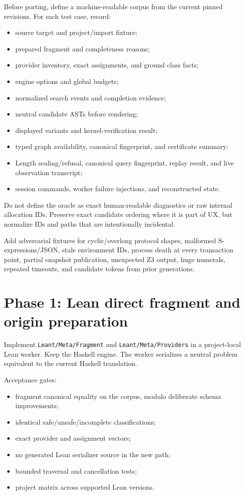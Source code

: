 \documentclass[10pt,letterpaper,oneside]{report}
\newcommand{\filepath}[1]{\nolinkurl{#1}}
\begin{document}
Before porting, define a machine-readable corpus from the current pinned revisions. For each test case, record:

\begin{itemize}
  \item source target and project/import fixture;
  \item prepared fragment and completeness reasons;
  \item provider inventory, exact assignments, and ground class facts;
  \item engine options and global budgets;
  \item normalized search events and completion evidence;
  \item neutral candidate ASTs before rendering;
  \item displayed variants and kernel-verification result;
  \item typed graph availability, canonical fingerprint, and certificate summary;
  \item Length sealing/refusal, canonical query fingerprint, replay result, and live observation transcript;
  \item session commands, worker failure injections, and reconstructed state.
\end{itemize}

Do not define the oracle as exact human-readable diagnostics or raw internal allocation IDs. Preserve exact candidate ordering where it is part of UX, but normalize IDs and paths that are intentionally incidental.

Add adversarial fixtures for cyclic/overlong protocol shapes, malformed S-expressions/JSON, stale environment IDs, process death at every transaction point, partial snapshot publication, unexpected Z3 output, huge numerals, repeated timeouts, and candidate tokens from prior generations.

\section{Phase 1: Lean direct fragment and origin preparation}

Implement \filepath{Leant/Meta/Fragment} and \filepath{Leant/Meta/Providers} in a project-local Lean worker. Keep the Haskell engine. The worker serializes a neutral problem equivalent to the current Haskell translation.

Acceptance gates:

\begin{itemize}
  \item fragment canonical equality on the corpus, modulo deliberate schema improvements;
  \item identical safe/unsafe/incomplete classifications;
  \item exact provider and assignment vectors;
  \item no generated Lean serializer source in the new path;
  \item bounded traversal and cancellation tests;
  \item project matrix across supported Lean versions.
\end{itemize}
\end{document}
